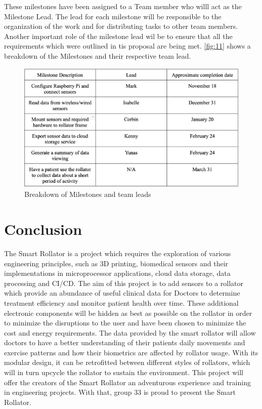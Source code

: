 \documentclass{article}
\begin{document}
These milestones have been assigned to a Team member who willl act as the Milestone Lead. The lead for each milestone will be responsible to the organization of the work and for distributing tasks to other team members. Another important role of the milestone lead wil be to ensure that all the requirements which were outlined in tis proposal are being met. \autoref{fig:11} shows a breakdown of the Milestones and their respective team lead. 

\begin{figure}[!h]
    \centering
    \includegraphics[scale=0.7]{sysc4907_milestone_leads.png}
    \caption{Breakdown of Milestones and team leads}
    \label{fig:11}
\end{figure}

\newpage
\section{Conclusion}
The Smart Rollator is a project which requires the exploration of various engineering principles, such as 3D printing, biomedical sensors and their implementations in microprocessor applications, cloud data storage, data processing and CI/CD. The aim of this project is to add sensors to a rollator which provide an abundance of useful clinical data for Doctors to determine treatment efficiency and monitor patient health over time. These additional electronic components will be hidden as best as possible on the rollator in order to minimize the disruptions to the user and have been chosen to minimize the cost and energy requirements. The data provided by the smart rollator will allow doctors to have a better understanding of their patients daily movements and exercise patterns and how their biometrics are affected by rollator usage. With its modular design, it can be retrofitted between different styles of rollators, which will in turn upcycle the rollator to sustain the environment. This project will offer the creators of the Smart Rollator an adventurous experience and training in engineering projects. With that, group 33 is proud to present the Smart Rollator.
\end{document}
